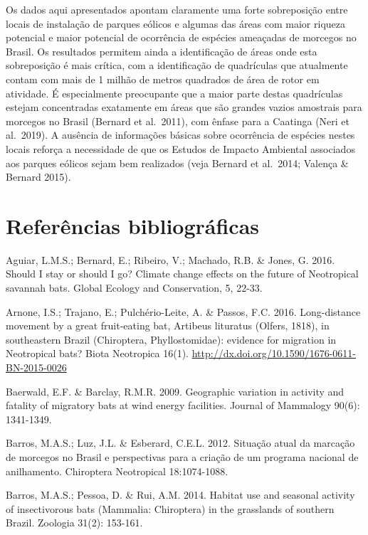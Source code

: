 \documentclass[
]{scrbook}
\begin{document}
Os dados aqui apresentados apontam claramente uma forte sobreposição entre locais de instalação de parques eólicos e algumas das áreas com maior riqueza potencial e maior potencial de ocorrência de espécies ameaçadas de morcegos no Brasil. Os resultados permitem ainda a identificação de áreas onde esta sobreposição é mais crítica, com a identificação de quadrículas que atualmente contam com mais de 1 milhão de metros quadrados de área de rotor em atividade. É especialmente preocupante que a maior parte destas quadrículas estejam concentradas exatamente em áreas que são grandes vazios amostrais para morcegos no Brasil (Bernard et al.~2011), com ênfase para a Caatinga (Neri et al.~2019). A ausência de informações básicas sobre ocorrência de espécies nestes locais reforça a necessidade de que os Estudos de Impacto Ambiental associados aos parques eólicos sejam bem realizados (veja Bernard et al.~2014; Valença \& Bernard 2015).

\hypertarget{referencias-morcegos}{%
\section{Referências bibliográficas}\label{referencias-morcegos}}

Aguiar, L.M.S.; Bernard, E.; Ribeiro, V.; Machado, R.B. \& Jones, G. 2016. Should I stay or should I go? Climate change effects on the future of Neotropical savannah bats. Global Ecology and Conservation, 5, 22-33.

Arnone, I.S.; Trajano, E.; Pulchério-Leite, A. \& Passos, F.C. 2016. Long-distance movement by a great fruit-eating bat, Artibeus lituratus (Olfers, 1818), in southeastern Brazil (Chiroptera, Phyllostomidae): evidence for migration in Neotropical bats? Biota Neotropica 16(1). \url{http://dx.doi.org/10.1590/1676-0611-BN-2015-0026}

Baerwald, E.F. \& Barclay, R.M.R. 2009. Geographic variation in activity and fatality of migratory bats at wind energy facilities. Journal of Mammalogy 90(6): 1341-1349.

Barros, M.A.S.; Luz, J.L. \& Esberard, C.E.L. 2012. Situação atual da marcação de morcegos no Brasil e perspectivas para a criação de um programa nacional de anilhamento. Chiroptera Neotropical 18:1074-1088.

Barros, M.A.S.; Pessoa, D. \& Rui, A.M. 2014. Habitat use and seasonal activity of insectivorous bats (Mammalia: Chiroptera) in the grasslands of southern Brazil. Zoologia 31(2): 153-161.
\end{document}
